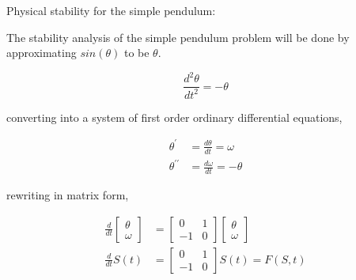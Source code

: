 \documentclass[a4paper,11pt]{report}
\begin{document}
\begin{enumerate}
    \begin{figure}[ht!]
    \centering
    \resizebox{0.95\linewidth}{!}{}
    \end{figure}

    \begin{figure}[ht!]
    \centering
    \resizebox{0.95\linewidth}{!}{}
    \end{figure}

    \begin{figure}[ht!]
    \centering
    \resizebox{0.95\linewidth}{!}{}
    \end{figure}

    \begin{figure}[ht!]
    \centering
    \resizebox{0.95\linewidth}{!}{}
    \end{figure}

    \pagebreak

    Physical stability for the simple pendulum:
    
    The stability analysis of the simple pendulum problem will be done by 
    approximating $sin(\theta)$ to be $\theta$.

    \begin{equation*}
    \frac{d^2 \theta}{dt^2} = - \theta
    \end{equation*}

    converting into a system of first order ordinary differential equations,

    \begin{equation*}
    \begin{aligned}
    \theta^{\prime} &= \frac{d \theta}{dt} = \omega \\
    \theta^{\prime\prime} &= \frac{d \omega}{dt} = - \theta
    \end{aligned}
    \end{equation*}

    rewriting in matrix form,
        
    \begin{equation*}
    \begin{aligned}
    \frac{d}{dt} \begin{bmatrix} \theta \\ \omega \end{bmatrix} &= \begin{bmatrix} 0 & 1 \\ -1 & 0 \end{bmatrix} \begin{bmatrix} \theta \\ \omega \end{bmatrix} \\
    \frac{d}{dt} S(t) &= \begin{bmatrix} 0 & 1 \\ -1 & 0 \end{bmatrix} S(t) = F(S, t)
    \end{aligned}
    \end{equation*}


\end{enumerate}
\end{document}
